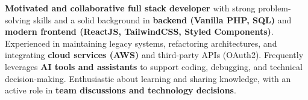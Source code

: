 \documentclass[11pt, a4paper]{russell}
\begin{document}
\makecvheader
{}



    \begin{cvparagraph}
        \textbf{Motivated and collaborative full stack developer} with strong problem-solving skills and a solid background in \textbf{backend (Vanilla PHP, SQL)} and \textbf{modern frontend (ReactJS, TailwindCSS, Styled Components)}. Experienced in maintaining legacy systems, refactoring architectures, and integrating \textbf{cloud services (AWS)} and third-party APIs (OAuth2). Frequently leverages \textbf{AI tools and assistants} to support coding, debugging, and technical decision-making. Enthusiastic about learning and sharing knowledge, with an active role in \textbf{team discussions and technology decisions}.
    \end{cvparagraph}




    \begin{cvskills}
    \end{cvskills}



\end{document}
